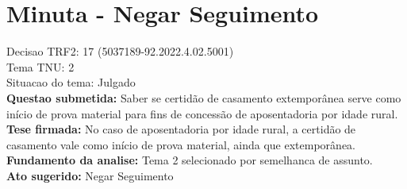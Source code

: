 \documentclass{article}
\begin{document}
\section*{Minuta - Negar Seguimento}
Decisao TRF2: 17 (5037189-92.2022.4.02.5001)\\
Tema TNU: 2\\
Situacao do tema: Julgado\\
\textbf{Questao submetida:} Saber se certidão de casamento extemporânea serve como início de prova material para fins de concessão de aposentadoria por idade rural.\\
\textbf{Tese firmada:} No caso de aposentadoria por idade rural, a certidão de casamento vale como início de prova material, ainda que extemporânea.\\
\textbf{Fundamento da analise:} Tema 2 selecionado por semelhanca de assunto.\\
\textbf{Ato sugerido:} Negar Seguimento
\end{document}
